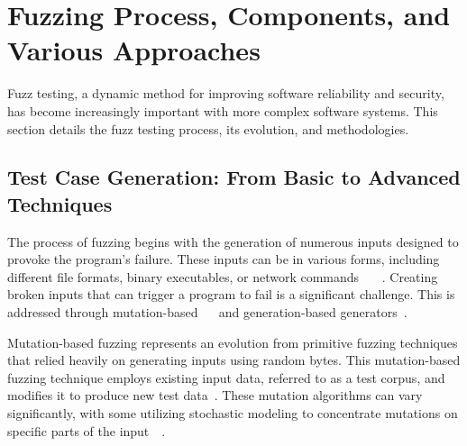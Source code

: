 

\section{Fuzzing Process, Components, and Various Approaches}\label{sec:fuzzing_methods}
Fuzz testing, a dynamic method for improving software reliability and security,
has become increasingly important with more complex software systems. This
section details the fuzz testing process, its evolution, and methodologies.

\subsection{Test Case Generation: From Basic to Advanced Techniques}
The process of fuzzing begins with the generation of numerous inputs
designed to provoke the program's failure. These inputs can be in various forms,
including different file formats, binary executables, or network commands
~\cite{mcnally2012fuzzing}~\cite{bohme2020fuzzing}~\cite{manes2019art}.
Creating broken inputs that can trigger a program to fail is a
significant challenge. This is addressed through mutation-based
~\cite{miller2007analysis}~\cite{lyu2022ems} and
generation-based generators~\cite{pang2023generation}.

Mutation-based fuzzing represents an evolution from primitive fuzzing techniques
that relied heavily on generating inputs using random bytes.
This mutation-based fuzzing technique employs existing input data,
referred to as a test \gls{corpus}, and modifies it to produce new test data~\cite{miller2007analysis}.
These mutation algorithms can vary significantly, with some utilizing
stochastic modeling to concentrate mutations on specific parts of the input~\cite{lyu2022ems}~\cite{miller2007analysis}.

